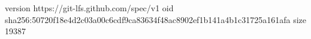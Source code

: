 version https://git-lfs.github.com/spec/v1
oid sha256:50720f18e4d2c03a00c6cdf9ca83634f48ac8902ef1b141a4b1c31725a161afa
size 19387
